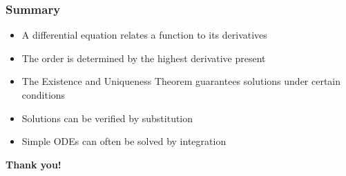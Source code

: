 \begin{frame}
    \frametitle{Summary}
    
    \begin{itemize}
        \item A differential equation relates a function to its derivatives
        \item The order is determined by the highest derivative present
        \item The Existence and Uniqueness Theorem guarantees solutions under certain conditions
        \item Solutions can be verified by substitution
        \item Simple ODEs can often be solved by integration
    \end{itemize}
    
    \vspace{1cm}
    
    \centering
    \Large \textbf{Thank you!}
\end{frame}


